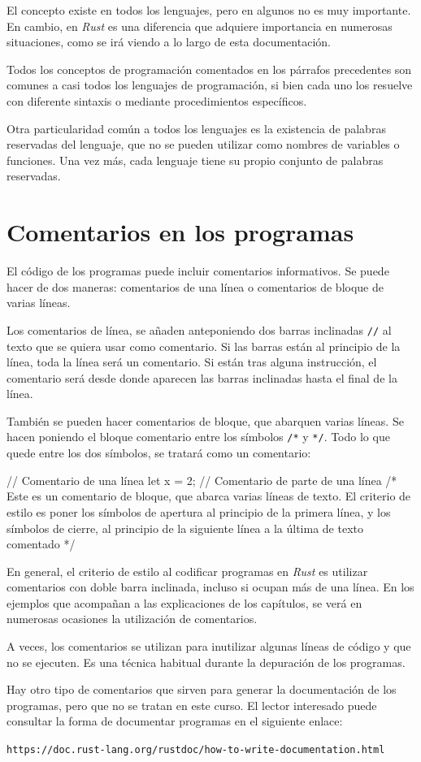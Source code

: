El concepto existe en todos los lenguajes, pero en algunos no es muy importante. En cambio, en \textit{Rust} es una diferencia que adquiere importancia en numerosas situaciones, como se irá viendo a lo largo de esta documentación.

Todos los conceptos de programación comentados en los párrafos precedentes son comunes a casi todos los lenguajes de programación, si bien cada uno los resuelve con diferente sintaxis o mediante procedimientos
específicos.

Otra particularidad común a todos los lenguajes es la existencia de palabras reservadas del lenguaje, que no se pueden utilizar como nombres de variables o funciones. Una vez más, cada lenguaje tiene su propio conjunto de palabras reservadas.

\section{Comentarios en los programas}
\label{sec_comentarios}
\noindent El código de los programas puede incluir comentarios informativos. Se puede hacer de dos maneras: comentarios de una línea o comentarios de bloque de varias líneas.

Los comentarios de línea, se añaden anteponiendo dos barras inclinadas \texttt{//} al texto que se quiera usar como comentario. Si las barras están al principio de la línea, toda la línea será un comentario. Si están tras alguna instrucción, el comentario será desde donde aparecen las barras inclinadas hasta el final de la línea.

También se pueden hacer comentarios de bloque, que abarquen varias líneas. Se hacen poniendo el bloque comentario entre los símbolos \texttt{/*} y \texttt{*/}. Todo lo que quede entre los dos símbolos, se tratará como un comentario:

\begin{Codigo}
   // Comentario de una línea
   let x = 2; // Comentario de parte de una línea
   /* Este es un comentario de bloque,
   que abarca varias líneas de texto.
   El criterio de estilo es poner los símbolos
   de apertura al principio de la primera línea,
   y los símbolos de cierre, al principio de la
   siguiente línea a la última de texto comentado
   */
\end{Codigo}

En general, el criterio de estilo al codificar programas en \textit{Rust} es utilizar comentarios con doble barra inclinada, incluso si ocupan más de una línea. En los ejemplos que acompañan a las explicaciones de los capítulos, se verá en numerosas ocasiones la utilización de comentarios.

A veces, los comentarios se utilizan para inutilizar algunas líneas de código y que no se ejecuten. Es una técnica habitual durante la depuración de los programas.

Hay otro tipo de comentarios que sirven para generar la documentación de los programas, pero que no se tratan en este curso. El lector interesado puede consultar la forma de documentar programas en el siguiente enlace:


{\centering\small \texttt{https://doc.rust-lang.org/rustdoc/how-to-write-documentation.html} \par}

